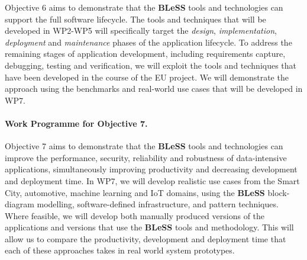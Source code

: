 \documentclass[a4paper,11pt]{article}
\newcommand{\project}[1]{\textbf{#1}\xspace}
\newcommand{\BLESS}{\project{BLeSS}}
\newcommand{\TheProject}{\BLESS}
\begin{document}
Objective 6 aims to demonstrate that the \TheProject{} tools and technologies can support the full software lifecycle.
The tools and techniques that will be developed in WP2-WP5 will specifically target the
\emph{design}, \emph{implementation}, \emph{deployment} and \emph{maintenance} phases of the application lifecycle. 
To address the remaining stages of application development, including requirements capture, debugging, testing 
and verification,  we will exploit the tools and techniques that have been
developed in the course of the EU \rephrase project.  We will demonstrate the approach using
the benchmarks and real-world use cases that will be developed in WP7.


\paragraph*{Work Programme for Objective 7.}

Objective 7 aims to demonstrate that the \TheProject{} tools and technologies can improve the performance, security,
reliability and robustness of data-intensive applications, simultaneously improving productivity and
decreasing development and deployment time. In WP7, we will develop realistic use cases from the Smart City, 
automotive, machine learning and IoT domains, using the \TheProject{} block-diagram modelling, software-defined infrastructure, and pattern 
techniques.
Where feasible, we will develop both manually produced versions of the applications and versions that use
the \TheProject{} tools and methodology.  This will allow us to compare the productivity, development and deployment time that
each of these approaches takes in real world system prototypes. 
\end{document}
